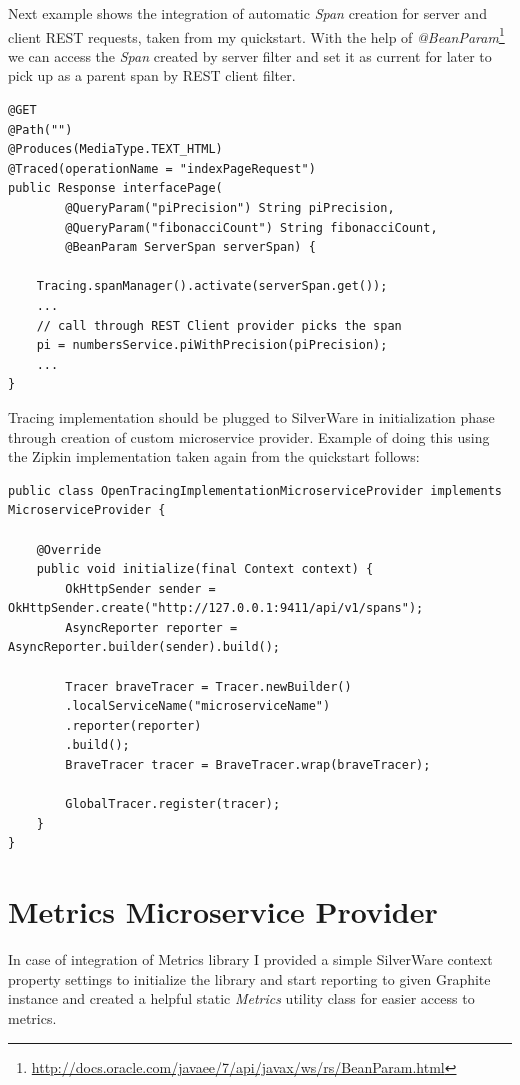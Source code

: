 \documentclass[12pt,oneside]{fithesis2}
\begin{document}
Next example shows the integration of automatic \textit{Span} creation for server and client REST requests, taken from my quickstart. With the help of \textit{@BeanParam}\footnote{\url{http://docs.oracle.com/javaee/7/api/javax/ws/rs/BeanParam.html}} we can access the \textit{Span} created by server filter and set it as current for later to pick up as a parent span by REST client filter.
\newpage
\begin{lstlisting}[caption = Integration with REST, label = restintegration, style=eclipse_java]
@GET
@Path("")
@Produces(MediaType.TEXT_HTML)
@Traced(operationName = "indexPageRequest")
public Response interfacePage(
		@QueryParam("piPrecision") String piPrecision,
		@QueryParam("fibonacciCount") String fibonacciCount,
		@BeanParam ServerSpan serverSpan) {
		
	Tracing.spanManager().activate(serverSpan.get());
	...
	// call through REST Client provider picks the span
	pi = numbersService.piWithPrecision(piPrecision);
	...
}
\end{lstlisting}

Tracing implementation should be plugged to SilverWare in initialization phase through creation of custom microservice provider. Example of doing this using the Zipkin implementation taken again from the quickstart follows:

\begin{lstlisting}[caption = Tracing implementation plugging, label = zipkinimpl, style=eclipse_java]
public class OpenTracingImplementationMicroserviceProvider implements MicroserviceProvider {

	@Override
	public void initialize(final Context context) {
		OkHttpSender sender = OkHttpSender.create("http://127.0.0.1:9411/api/v1/spans");
		AsyncReporter reporter = AsyncReporter.builder(sender).build();

		Tracer braveTracer = Tracer.newBuilder()
		.localServiceName("microserviceName")
		.reporter(reporter)
		.build();
		BraveTracer tracer = BraveTracer.wrap(braveTracer);

		GlobalTracer.register(tracer);
	}
}
\end{lstlisting}


\section{Metrics Microservice Provider}

In case of integration of Metrics library I provided a simple SilverWare context property settings to initialize the library and start reporting to given Graphite instance and created a helpful static \textit{Metrics} utility class for easier access to metrics.
\end{document}
